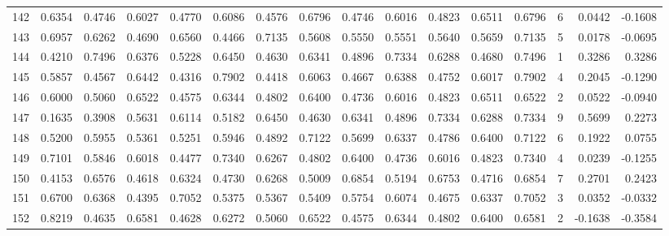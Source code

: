 \begin{tabular}{lrrrrrrrrrrrrrrr}
142 &      0.6354 &  0.4746 &  0.6027 &  0.4770 &  0.6086 &  0.4576 &  0.6796 &  0.4746 &  0.6016 &  0.4823 &   0.6511 &     0.6796 &      6 &                    0.0442 &                    -0.1608 \\
143 &      0.6957 &  0.6262 &  0.4690 &  0.6560 &  0.4466 &  0.7135 &  0.5608 &  0.5550 &  0.5551 &  0.5640 &   0.5659 &     0.7135 &      5 &                    0.0178 &                    -0.0695 \\
144 &      0.4210 &  0.7496 &  0.6376 &  0.5228 &  0.6450 &  0.4630 &  0.6341 &  0.4896 &  0.7334 &  0.6288 &   0.4680 &     0.7496 &      1 &                    0.3286 &                     0.3286 \\
145 &      0.5857 &  0.4567 &  0.6442 &  0.4316 &  0.7902 &  0.4418 &  0.6063 &  0.4667 &  0.6388 &  0.4752 &   0.6017 &     0.7902 &      4 &                    0.2045 &                    -0.1290 \\
146 &      0.6000 &  0.5060 &  0.6522 &  0.4575 &  0.6344 &  0.4802 &  0.6400 &  0.4736 &  0.6016 &  0.4823 &   0.6511 &     0.6522 &      2 &                    0.0522 &                    -0.0940 \\
147 &      0.1635 &  0.3908 &  0.5631 &  0.6114 &  0.5182 &  0.6450 &  0.4630 &  0.6341 &  0.4896 &  0.7334 &   0.6288 &     0.7334 &      9 &                    0.5699 &                     0.2273 \\
148 &      0.5200 &  0.5955 &  0.5361 &  0.5251 &  0.5946 &  0.4892 &  0.7122 &  0.5699 &  0.6337 &  0.4786 &   0.6400 &     0.7122 &      6 &                    0.1922 &                     0.0755 \\
149 &      0.7101 &  0.5846 &  0.6018 &  0.4477 &  0.7340 &  0.6267 &  0.4802 &  0.6400 &  0.4736 &  0.6016 &   0.4823 &     0.7340 &      4 &                    0.0239 &                    -0.1255 \\
150 &      0.4153 &  0.6576 &  0.4618 &  0.6324 &  0.4730 &  0.6268 &  0.5009 &  0.6854 &  0.5194 &  0.6753 &   0.4716 &     0.6854 &      7 &                    0.2701 &                     0.2423 \\
151 &      0.6700 &  0.6368 &  0.4395 &  0.7052 &  0.5375 &  0.5367 &  0.5409 &  0.5754 &  0.6074 &  0.4675 &   0.6337 &     0.7052 &      3 &                    0.0352 &                    -0.0332 \\
152 &      0.8219 &  0.4635 &  0.6581 &  0.4628 &  0.6272 &  0.5060 &  0.6522 &  0.4575 &  0.6344 &  0.4802 &   0.6400 &     0.6581 &      2 &                   -0.1638 &                    -0.3584 \\

\end{tabular}
